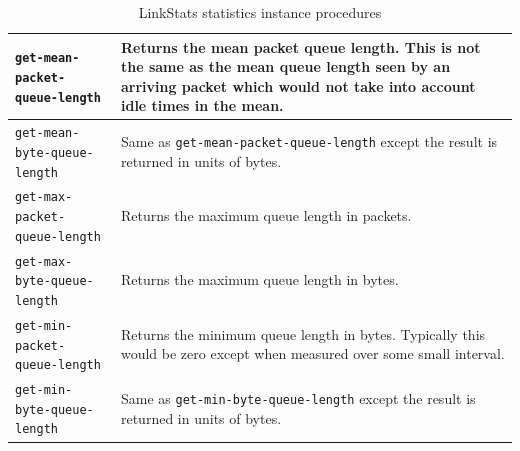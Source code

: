 \documentclass[11pt]{article}
\begin{document}
\begin{table}[ht]
\begin{center}
\begin{tabular}{|l|l|}
\verb|get-mean-packet-queue-length| &
  \begin{minipage}[c]{3.5in}
  \vspace{0.05in}
  Returns the mean packet queue length.  This is not the same as the
  mean queue length seen by an arriving packet which would not take
  into account idle times in the mean.
  \vspace{0.05in}
  \end{minipage} \\ \hline

\verb|get-mean-byte-queue-length| &
  \begin{minipage}[c]{3.5in}
  \vspace{0.05in}
  Same as \verb|get-mean-packet-queue-length| except the result is 
  returned in units of bytes.
  \vspace{0.05in}
  \end{minipage} \\ \hline

\verb|get-max-packet-queue-length| &
  \begin{minipage}[c]{3.5in}
  \vspace{0.05in}
  Returns the maximum queue length in packets.
  \vspace{0.05in}
  \end{minipage} \\ \hline

\verb|get-max-byte-queue-length| &
  \begin{minipage}[c]{3.5in}
  \vspace{0.05in}
  Returns the maximum queue length in bytes.
  \vspace{0.05in}
  \end{minipage} \\ \hline

\verb|get-min-packet-queue-length| &
  \begin{minipage}[c]{3.5in}
  \vspace{0.05in}
  Returns the minimum queue length in bytes.  Typically this would be
  zero except when measured over some small interval.
  \vspace{0.05in}
  \end{minipage} \\ \hline

\verb|get-min-byte-queue-length| &
  \begin{minipage}[c]{3.5in}
  \vspace{0.05in}
  Same as \verb|get-min-byte-queue-length| except the result is
  returned in units of bytes.
  \vspace{0.05in}
  \end{minipage} \\ \hline

\end{tabular}
\end{center}
\caption{LinkStats statistics instance procedures}\label{LinkStatsTable}
\end{table}
\end{document}
